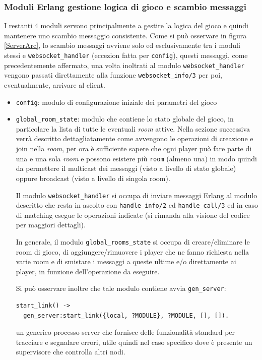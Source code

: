 \documentclass[paper=a4, fontsize=11pt]{scrartcl} %
\numberwithin{equation}{section} %
\numberwithin{figure}{section} %
\numberwithin{table}{section} %
\begin{document}
\subsubsection{Moduli Erlang gestione logica di gioco e scambio messaggi}
I restanti 4 moduli servono principalmente a gestire la logica del gioco e quindi mantenere uno scambio messaggio consistente. Come si può osservare in figura \ref{ServerArc}, lo scambio messaggi avviene solo ed esclusivamente tra i moduli stessi e \texttt{websocket\_handler} (eccezion fatta per \texttt{config}), questi messaggi, come precedentemente affermato, una volta inoltrati al modulo \texttt{websocket\_handler} vengono passati direttamente alla funzione \texttt{websocket\_info/3} per poi, eventualmente, arrivare al client.
\begin{itemize}
\item \texttt{config}: modulo di configurazione iniziale dei parametri del gioco
\item \texttt{global\_room\_state}: modulo che contiene lo stato globale del gioco, in particolare la lista di tutte le eventuali \textit{room} attive. Nella sezione successiva verrà descritto dettagliatamente come avvengono le operazioni di creazione e join nella \textit{room}, per ora è sufficiente sapere che ogni player può fare parte di una e una sola \textit{room} e possono esistere più \texttt{room} (almeno una) in modo quindi da permettere il multicast dei messaggi (visto a livello di stato globale) oppure broadcast (visto a livello di singola room).

Il modulo \texttt{websocket\_handler} si occupa di inviare messaggi Erlang al modulo descritto che resta in ascolto con \texttt{handle\_info/2} ed \texttt{handle\_call/3} ed in caso di matching esegue le operazioni indicate (si rimanda alla visione del codice per maggiori dettagli).

In generale, il modulo \texttt{global\_rooms\_state} si occupa di creare/eliminare le room di gioco, di aggiungere/rimuovere i player che ne fanno richiesta nella varie room e di smistare i messaggi a queste ultime e/o direttamente ai player, in funzione dell'operazione da eseguire.

Si può osservare inoltre che tale modulo contiene avvia \texttt{gen\_server}:
\begin{lstlisting}[basicstyle=\footnotesize]
start_link() ->
  gen_server:start_link({local, ?MODULE}, ?MODULE, [], []).
\end{lstlisting}
un generico processo server che fornisce delle funzionalità standard per tracciare e segnalare errori, utile quindi nel caso specifico dove è presente un supervisore che controlla altri nodi.


\end{itemize}
\end{document}
